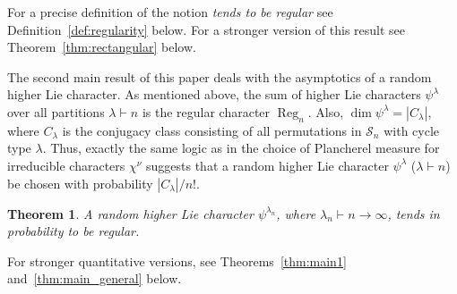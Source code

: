 \documentclass[12pt]%
{amsart}
\renewcommand\S{{\mathcal S}}
\DeclareMathOperator\Reg{Reg}
\newcommand{\la}{{\lambda}}
\newcommand{\si}{{\sigma}}
\theoremstyle{plain}
\newtheorem{theorem}{Theorem}[section]
\theoremstyle{definition}
\newtheorem{definition}[theorem]{Definition}
\theoremstyle{remark}
\newcommand{\todo}[1]{\vspace{5 mm}\par \noindent
	\marginpar{\textsc{ToDo}} \framebox{\begin{minipage}[c]{0.95
				\textwidth}
			#1 \end{minipage}}\vspace{5 mm}\par}
\begin{document}
For a precise definition of the notion {\em tends to be regular} see Definition~\ref{def:regularity} below. For  
a stronger version of this result see Theorem~\ref{thm:rectangular} below.



The second main result of this paper deals with the asymptotics of a random higher Lie character. 
As mentioned above,
the sum of higher Lie characters $\psi^\la$ over all partitions $\la \vdash n$ is the regular character $\Reg_n$. Also, $\dim\psi^\la=|C_\la|$, where $C_\la$ is the conjugacy class consisting of all permutations in $\S_n$ with cycle type $\la$. Thus, exactly the same logic as in the choice of Plancherel measure for irreducible characters $\chi^\nu$ suggests that 
a random higher Lie character $\psi^\la$ ($\la \vdash n$) be chosen with probability  $|C_\la|/n!$. 



\begin{theorem}\label{thm:main} 
     A random higher Lie character $\psi^{\la_n}$, where $\la_n \vdash n \to \infty$, 
    tends in probability to be regular.
\end{theorem}

For stronger quantitative versions, see Theorems~\ref{thm:main1} and~\ref{thm:main_general} below. 
\end{document}

